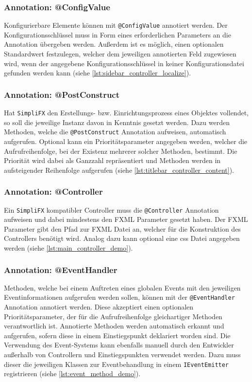 \subsubsection{Annotation: @ConfigValue}
Konfigurierbare Elemente können mit \texttt{@ConfigValue} annotiert werden. Der Konfigurationsschlüssel muss in Form eines erforderlichen Parameters an die Annotation übergeben werden. Außerdem ist es möglich, einen optionalen Standardwert festzulegen, welcher dem jeweiligen annotierten Feld zugewiesen wird, wenn der angegebene Konfigurationsschlüssel in keiner Konfigurationsdatei gefunden werden kann (siehe \autoref{lst:sidebar_controller_localize}).
\subsubsection{Annotation: @PostConstruct}
Hat \texttt{SimpliFX} den Erstellungs- bzw. Einrichtungsprozess eines Objektes vollendet, so soll die jeweilige Instanz davon in Kenntnis gesetzt werden. Dazu werden Methoden, welche die \texttt{@PostConstruct} Annotation aufweisen, automatisch aufgerufen. Optional kann ein Prioritätsparameter angegeben werden, welcher die Aufrufreihenfolge, bei der Existenz mehrerer solcher Methoden, bestimmt. Die Priorität wird dabei als Ganzzahl repräsentiert und Methoden werden in aufsteigender Reihenfolge aufgerufen (siehe \autoref{lst:titlebar_controller_content}).
\subsubsection{Annotation: @Controller}
Ein \texttt{SimpliFX} kompatibler Controller muss die \texttt{@Controller} Annotation aufweisen und dabei mindestens den FXML Parameter gesetzt haben. Der FXML Parameter gibt den Pfad zur FXML Datei an, welcher für die Konstruktion des Controllers benötigt wird. Analog dazu kann optional eine \ac{css} Datei angegeben werden (siehe \autoref{lst:main_controller_demo}).
\subsubsection{Annotation: @EventHandler}
Methoden, welche bei einem Auftreten eines globalen Events mit den jeweiligen Eventinformationen aufgerufen werden sollen, können mit der \texttt{@EventHandler} Annotation annotiert werden. Diese akzeptiert einen optionalen Prioritätsparameter, der für die Aufrufreihenfolge gleichartiger Methoden verantwortlich ist. Annotierte Methoden werden automatisch erkannt und aufgerufen, sofern diese in einem Einstiegspunkt deklariert worden sind. Die Verwendung des Event-Systems kann ebenfalls manuell durch den Entwickler außerhalb von Controllern und Einstiegspunkten verwendet werden. Dazu muss dieser die jeweiligen Klassen zur Eventbehandlung in einem \texttt{IEventEmitter} registrieren (siehe \autoref{lst:event_method_demo}).
